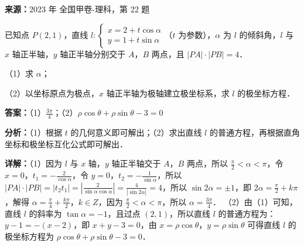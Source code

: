 \begin{question}[points=10]
\textbf{来源：}2023 年 全国甲卷-理科，第 22 题\par
已知点 $P(2,1)$，直线 $l: \begin{cases} x = 2 + t\cos\alpha \\ y = 1 + t\sin\alpha \end{cases}$（$t$ 为参数），$\alpha$ 为 $l$ 的倾斜角，$l$ 与 $x$ 轴正半轴，$y$ 轴正半轴分别交于 $A$，$B$ 两点，且 $|PA|\cdot|PB|=4$．

（1）求 $\alpha$；

（2）以坐标原点为极点，$x$ 轴正半轴为极轴建立极坐标系，求 $l$ 的极坐标方程．
\begin{solution}
\textbf{答案：}（1）$\frac{3\pi}{4}$；（2）$\rho\cos\theta + \rho\sin\theta - 3 = 0$

\textbf{分析：}（1）根据 $t$ 的几何意义即可解出；（2）求出直线 $l$ 的普通方程，再根据直角坐标和极坐标互化公式即可解出．

\textbf{详解：}（1）因为 $l$ 与 $x$ 轴，$y$ 轴正半轴交于 $A$，$B$ 两点，所以 $\frac{\pi}{2}<\alpha<\pi$，令 $x=0$，$t_1=-\frac{2}{\cos\alpha}$，令 $y=0$，$t_2=-\frac{1}{\sin\alpha}$，所以 $|PA|\cdot|PB| = |t_2 t_1| = \left|\frac{2}{\sin\alpha\cos\alpha}\right| = \frac{4}{|\sin2\alpha|} = 4$，所以 $\sin2\alpha = \pm1$，即 $2\alpha = \frac{\pi}{2}+k\pi$，解得 $\alpha = \frac{\pi}{4}+\frac{k\pi}{2}$，$k\in Z$，因为 $\frac{\pi}{2}<\alpha<\pi$，所以 $\alpha = \frac{3\pi}{4}$．
（2）由（1）可知，直线 $l$ 的斜率为 $\tan\alpha = -1$，且过点 $(2,1)$，所以直线 $l$ 的普通方程为：$y-1 = -(x-2)$，即 $x+y-3=0$，由 $x=\rho\cos\theta$，$y=\rho\sin\theta$ 可得直线 $l$ 的极坐标方程为 $\rho\cos\theta + \rho\sin\theta - 3 = 0$．
\end{solution}
\end{question}

